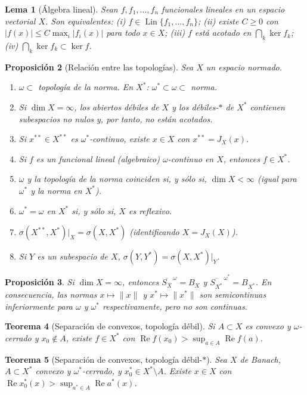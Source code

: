\documentclass[11pt,a4paper]{article}
\newcommand{\norm}[1]{\lVert #1\rVert}
\newcommand{\abs}[1]{\lvert #1\rvert}
\renewcommand{\Re}{\operatorname{Re}}
\newcommand{\Lin}{\operatorname{Lin}}
\renewcommand{\ker}{\operatorname{ker}}
\newcommand{\wcl}[1]{\overline{#1}^{\,\omega}}
\newcommand{\wscl}[1]{\overline{#1}^{\,\omega^*}}
\newcommand{\BX}{B_X}
\newcommand{\SX}{S_X}
\theoremstyle{plain}
\newtheorem{teorema}{Teorema}[section]
\newtheorem{lema}[teorema]{Lema}
\newtheorem{proposicion}[teorema]{Proposición}
\theoremstyle{definition}
\theoremstyle{remark}
\begin{document}
\begin{lema}[Álgebra lineal]
Sean $f,f_1,\dots,f_n$ funcionales lineales en un espacio vectorial $X$. Son equivalentes:
(i) $f\in\Lin\{f_1,\dots,f_n\}$;
(ii) existe $C\ge0$ con $\abs{f(x)}\le C\max_i\abs{f_i(x)}$ para todo $x\in X$;
(iii) $f$ está acotado en $\bigcap_{k}\ker f_k$;
(iv) $\bigcap_{k}\ker f_k\subset\ker f$.
\end{lema}

\begin{proposicion}[Relación entre las topologías]
Sea $X$ un espacio normado.
\begin{enumerate}[label=(\alph*)]
\item $\omega\subset$ topología de la norma. En $X^*$: $\omega^*\subset\omega\subset$ norma.
\item Si $\dim X=\infty$, los abiertos débiles de $X$ y los débiles-$*$ de $X^*$ contienen subespacios no nulos y, por tanto, no están acotados.
\item Si $x^{**}\in X^{**}$ es $\omega^*$-continuo, existe $x\in X$ con $x^{**}=J_X(x)$.
\item Si $f$ es un funcional lineal (algebraico) $\omega$-continuo en $X$, entonces $f\in X^*$.
\item $\omega$ y la topología de la norma coinciden si, y sólo si, $\dim X<\infty$ (igual para $\omega^*$ y la norma en $X^*$).
\item $\omega^*=\omega$ en $X^*$ si, y sólo si, $X$ es reflexivo.
\item $\sigma(X^{**},X^*)|_X=\sigma(X,X^*)$ (identificando $X=J_X(X)$).
\item Si $Y$ es un subespacio de $X$, $\sigma(Y,Y^*)=\sigma(X,X^*)|_Y$.
\end{enumerate}
\end{proposicion}

\begin{proposicion}
Si $\dim X=\infty$, entonces $\wcl{\SX}=\BX$ y $\wscl{S_{X^*}}=B_{X^*}$. En consecuencia, las normas $x\mapsto\norm x$ y $x^*\mapsto\norm{x^*}$ son semicontinuas inferiormente para $\omega$ y $\omega^*$ respectivamente, pero no son continuas.
\end{proposicion}

\begin{teorema}[Separación de convexos, topología débil]
Si $A\subset X$ es convexo y $\omega$-cerrado y $x_0\notin A$, existe $f\in X^*$ con $\Re f(x_0)>\sup_{a\in A}\Re f(a)$.
\end{teorema}

\begin{teorema}[Separación de convexos, topología débil-$*$]
Sea $X$ de Banach, $A\subset X^*$ convexo y $\omega^*$-cerrado, y $x_0^*\in X^*\setminus A$. Existe $x\in X$ con $\Re x_0^*(x)>\sup_{a^*\in A}\Re a^*(x)$.
\end{teorema}
\end{document}
